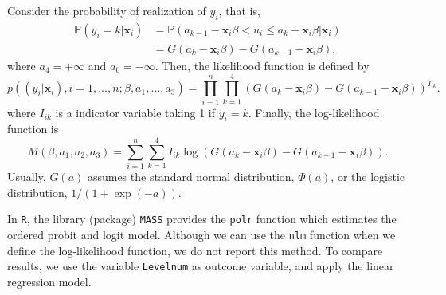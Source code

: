 \documentclass[
  12pt,
]{article}
\begin{document}
Consider the probability of realization of \(y_i\), that is,
\begin{equation*}
  \begin{split}
  \mathbb{P}(y_i = k | \mathbf{x}_i) 
  &= \mathbb{P}(a_{k-1} - \mathbf{x}_i \beta < u_i \le a_k - \mathbf{x}_i \beta | \mathbf{x}_i)  \\
  &= G(a_k - \mathbf{x}_i \beta) - G(a_{k-1} - \mathbf{x}_i \beta),
  \end{split}
\end{equation*} where \(a_{4} = +\infty\) and \(a_0 = -\infty\). Then,
the likelihood function is defined by \begin{equation*}
  p((y_i|\mathbf{x}_i), i = 1, \ldots, n; \beta, a_1, \ldots, a_3)
  = \prod_{i=1}^n \prod_{k=1}^4 (G(a_k - \mathbf{x}_i \beta) - G(a_{k-1} - \mathbf{x}_i \beta))^{I_{ik}}.
\end{equation*} where \(I_{ik}\) is a indicator variable taking 1 if
\(y_i = k\). Finally, the log-likelihood function is \begin{equation*}
  M(\beta, a_1, a_2, a_3) = \sum_{i=1}^n \sum_{k=1}^4 I_{ik} \log(G(a_k - \mathbf{x}_i \beta) - G(a_{k-1} - \mathbf{x}_i \beta)).
\end{equation*} Usually, \(G(a)\) assumes the standard normal
distribution, \(\Phi(a)\), or the logistic distribution,
\(1/(1 + \exp(-a))\).

In \texttt{R}, the library (package) \texttt{MASS} provides the
\texttt{polr} function which estimates the ordered probit and logit
model. Although we can use the \texttt{nlm} function when we define the
log-likelihood function, we do not report this method. To compare
results, we use the variable \texttt{Levelnum} as outcome variable, and
apply the linear regression model.
\end{document}
